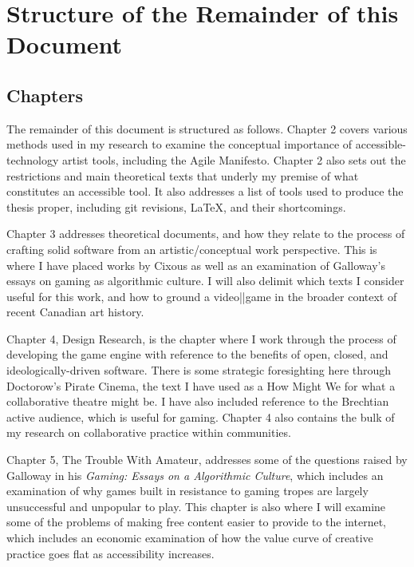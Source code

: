 
\section{Structure of the Remainder of this Document}

\subsection{Chapters}
The remainder of this document is structured as follows. Chapter 2 covers various methods used in my research to examine the conceptual importance of accessible-technology artist tools, including the Agile Manifesto. Chapter 2 also sets out the restrictions and main theoretical texts that underly my premise of what constitutes an accessible tool. It also addresses a list of tools used to produce the thesis proper, including git revisions, LaTeX, and their shortcomings. 

Chapter 3 addresses theoretical documents, and how they relate to the process of crafting solid software from an artistic/conceptual work perspective. This is where I have placed works by Cixous as well as an examination of Galloway's essays on gaming as algorithmic culture. I will also delimit which texts I consider useful for this work, and how to ground a video||game in the broader context of recent Canadian art history.

Chapter 4, Design Research, is the chapter where I work through the process of developing the game engine with reference to the benefits of open, closed, and ideologically-driven software. There is some strategic foresighting here through Doctorow's Pirate Cinema, the text I have used as a How Might We for what a collaborative theatre might be. I have also included reference to the Brechtian active audience, which is useful for gaming. Chapter 4 also contains the bulk of my research on collaborative practice within communities.

Chapter 5, The Trouble With Amateur, addresses some of the questions raised by Galloway in his \textit{Gaming: Essays on a Algorithmic Culture}, which includes an examination of why games built in resistance to gaming tropes are largely unsuccessful and unpopular to play. This chapter is also where I will examine some of the problems of making free content easier to provide to the internet, which includes an economic examination of how the value curve of creative practice goes flat as accessibility increases.

